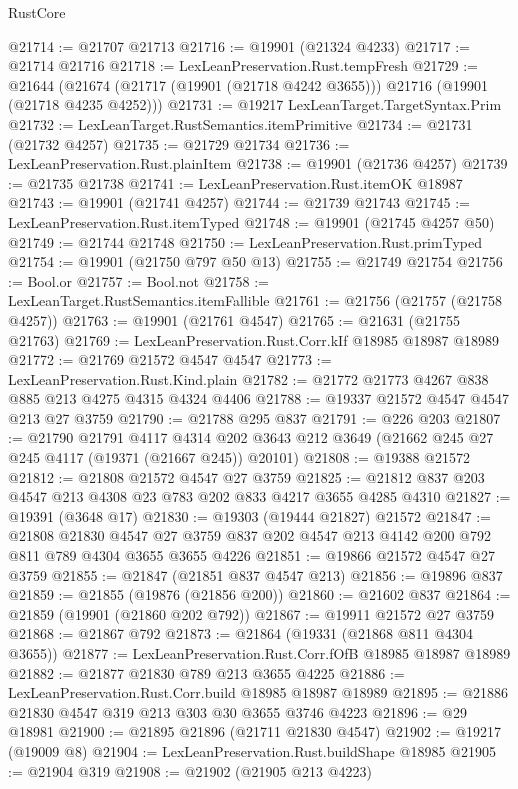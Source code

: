 \begin{lexlean}{RustCore}
\begin{coremodule}
@21714 := @21707 @21713
@21716 := @19901 (@21324 @4233)
@21717 := @21714 @21716
@21718 := LexLeanPreservation.Rust.tempFresh
@21729 := @21644
    (@21674 (@21717 (@19901 (@21718 @4242 @3655))) @21716 (@19901 (@21718 @4235 @4252)))
@21731 := @19217 LexLeanTarget.TargetSyntax.Prim
@21732 := LexLeanTarget.RustSemantics.itemPrimitive
@21734 := @21731 (@21732 @4257)
@21735 := @21729 @21734
@21736 := LexLeanPreservation.Rust.plainItem
@21738 := @19901 (@21736 @4257)
@21739 := @21735 @21738
@21741 := LexLeanPreservation.Rust.itemOK @18987
@21743 := @19901 (@21741 @4257)
@21744 := @21739 @21743
@21745 := LexLeanPreservation.Rust.itemTyped
@21748 := @19901 (@21745 @4257 @50)
@21749 := @21744 @21748
@21750 := LexLeanPreservation.Rust.primTyped
@21754 := @19901 (@21750 @797 @50 @13)
@21755 := @21749 @21754
@21756 := Bool.or
@21757 := Bool.not
@21758 := LexLeanTarget.RustSemantics.itemFallible
@21761 := @21756 (@21757 (@21758 @4257))
@21763 := @19901 (@21761 @4547)
@21765 := @21631 (@21755 @21763)
@21769 := LexLeanPreservation.Rust.Corr.kIf @18985 @18987 @18989
@21772 := @21769 @21572 @4547 @4547
@21773 := LexLeanPreservation.Rust.Kind.plain
@21782 := @21772 @21773 @4267 @838 @885 @213 @4275 @4315 @4324 @4406
@21788 := @19337 @21572 @4547 @4547 @213 @27 @3759
@21790 := @21788 @295 @837
@21791 := @226 @203
@21807 := @21790
    @21791
    @4117
    @4314
    @202
    @3643
    @212
    @3649
    (@21662 @245 @27 @245 @4117 (@19371 (@21667 @245)) @20101)
@21808 := @19388 @21572
@21812 := @21808 @21572 @4547 @27 @3759
@21825 := @21812 @837 @203 @4547 @213 @4308 @23 @783 @202 @833 @4217 @3655 @4285 @4310
@21827 := @19391 (@3648 @17)
@21830 := @19303 (@19444 @21827) @21572
@21847 := @21808
    @21830
    @4547
    @27
    @3759
    @837
    @202
    @4547
    @213
    @4142
    @200
    @792
    @811
    @789
    @4304
    @3655
    @3655
    @4226
@21851 := @19866 @21572 @4547 @27 @3759
@21855 := @21847 (@21851 @837 @4547 @213)
@21856 := @19896 @837
@21859 := @21855 (@19876 (@21856 @200))
@21860 := @21602 @837
@21864 := @21859 (@19901 (@21860 @202 @792))
@21867 := @19911 @21572 @27 @3759
@21868 := @21867 @792
@21873 := @21864 (@19331 (@21868 @811 @4304 @3655))
@21877 := LexLeanPreservation.Rust.Corr.fOfB @18985 @18987 @18989
@21882 := @21877 @21830 @789 @213 @3655 @4225
@21886 := LexLeanPreservation.Rust.Corr.build @18985 @18987 @18989
@21895 := @21886 @21830 @4547 @319 @213 @303 @30 @3655 @3746 @4223
@21896 := @29 @18981
@21900 := @21895 @21896 (@21711 @21830 @4547)
@21902 := @19217 (@19009 @8)
@21904 := LexLeanPreservation.Rust.buildShape @18985
@21905 := @21904 @319
@21908 := @21902 (@21905 @213 @4223)

\end{coremodule}
\end{lexlean}
